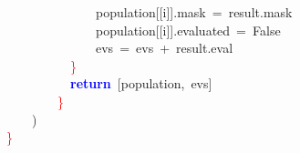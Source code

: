 \mbox{}\ \ \ \ \ \ \ \ \ \ \ \ \ \ population\textcolor{BrickRed}{[[}i\textcolor{BrickRed}{]].}mask\ \textcolor{BrickRed}{=}\ result\textcolor{BrickRed}{.}mask \\
\mbox{}\ \ \ \ \ \ \ \ \ \ \ \ \ \ population\textcolor{BrickRed}{[[}i\textcolor{BrickRed}{]].}evaluated\ \textcolor{BrickRed}{=}\ False \\
\mbox{}\ \ \ \ \ \ \ \ \ \ \ \ \ \ evs\ \textcolor{BrickRed}{=}\ evs\ \textcolor{BrickRed}{+}\ result\textcolor{BrickRed}{.}eval \\
\mbox{}\ \ \ \ \ \ \ \ \ \ \textcolor{Red}{\}} \\
\mbox{}\ \ \ \ \ \ \ \ \ \ \textbf{\textcolor{Blue}{return}}\ \textcolor{BrickRed}{[}population\textcolor{BrickRed}{,}\ evs\textcolor{BrickRed}{]} \\
\mbox{}\ \ \ \ \ \ \ \ \textcolor{Red}{\}} \\
\mbox{}\ \ \ \ \textcolor{BrickRed}{)} \\
\mbox{}\textcolor{Red}{\}} \\
\mbox{}
